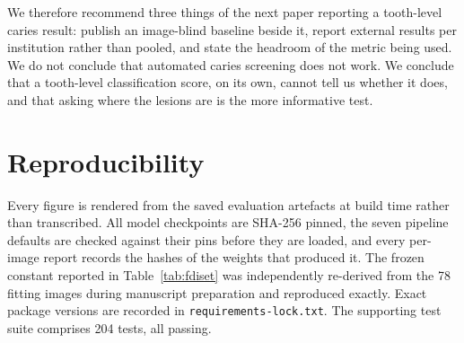 \documentclass[conference]{IEEEtran}
\begin{document}
We therefore recommend three things of the next paper reporting a tooth-level
caries result: publish an image-blind baseline beside it, report external results
per institution rather than pooled, and state the headroom of the metric being
used. We do not conclude that automated caries screening does not work. We
conclude that a tooth-level classification score, on its own, cannot tell us
whether it does, and that asking where the lesions are is the more informative
test.

\section*{Reproducibility}
Every figure is rendered from the saved evaluation artefacts at build time rather
than transcribed. All model checkpoints are SHA-256 pinned, the seven pipeline
defaults are checked against their pins before they are loaded, and every per-image
report records the hashes of the weights that produced it. The frozen constant
reported in Table~\ref{tab:fdiset} was independently re-derived from the 78
fitting images during manuscript preparation and reproduced exactly. Exact
package versions are recorded in \texttt{requirements-lock.txt}. The supporting
test suite comprises 204 tests, all passing.



\end{document}
